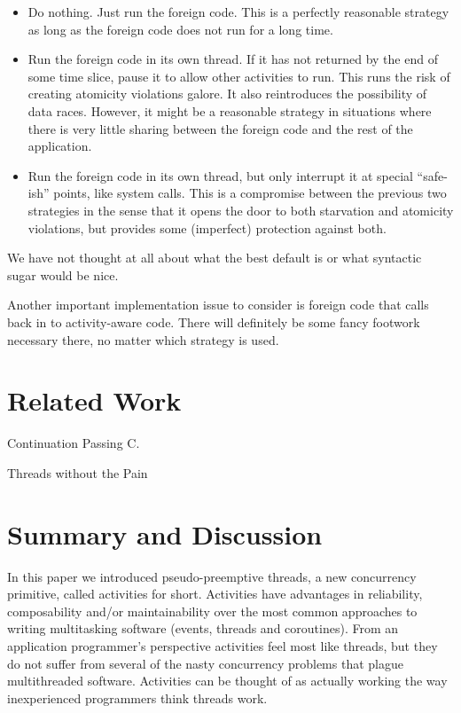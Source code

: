 \documentclass[10pt,preprint]{sigplanconf}
\begin{document}
\begin{itemize}
\item Do nothing.
  Just run the foreign code.
  This is a perfectly reasonable strategy as long as the foreign code does not run for a long time.
\item Run the foreign code in its own thread.
  If it has not returned by the end of some time slice, pause it to allow other activities to run.
  This runs the risk of creating atomicity violations galore.
  It also reintroduces the possibility of data races.
  However, it might be a reasonable strategy in situations where there is very little sharing between the foreign code and the rest of the application.
\item Run the foreign code in its own thread, but only interrupt it at special ``safe-ish'' points, like system calls.
  This is a compromise between the previous two strategies in the sense that it opens the door to both starvation and atomicity violations, but provides some (imperfect) protection against both.
\end{itemize}

We have not thought at all about what the best default is or what syntactic sugar would be nice.

Another important implementation issue to consider is foreign code that calls back in to activity-aware code.
There will definitely be some fancy footwork necessary there, no matter which strategy is used.

\section{Related Work}

Continuation Passing C.

Threads without the Pain

\section{Summary and Discussion}

In this paper we introduced pseudo-preemptive threads, a new concurrency primitive, called activities for short.
Activities have advantages in reliability, composability and/or maintainability over the most common approaches to writing multitasking software (events, threads and coroutines).
From an application programmer's perspective activities feel most like threads, but they do not suffer from several of the nasty concurrency problems that plague multithreaded software.
Activities can be thought of as actually working the way inexperienced programmers think threads work.
\end{document}
